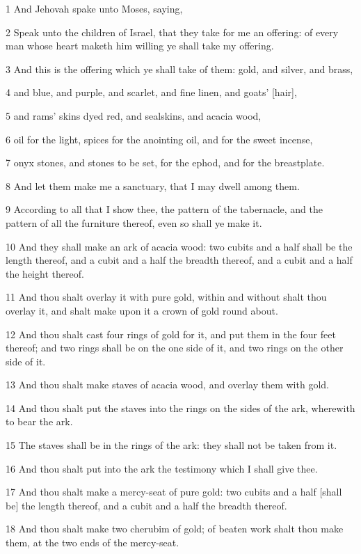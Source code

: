 \par 1 And Jehovah spake unto Moses, saying,
\par 2 Speak unto the children of Israel, that they take for me an offering: of every man whose heart maketh him willing ye shall take my offering.
\par 3 And this is the offering which ye shall take of them: gold, and silver, and brass,
\par 4 and blue, and purple, and scarlet, and fine linen, and goats' [hair],
\par 5 and rams' skins dyed red, and sealskins, and acacia wood,
\par 6 oil for the light, spices for the anointing oil, and for the sweet incense,
\par 7 onyx stones, and stones to be set, for the ephod, and for the breastplate.
\par 8 And let them make me a sanctuary, that I may dwell among them.
\par 9 According to all that I show thee, the pattern of the tabernacle, and the pattern of all the furniture thereof, even so shall ye make it.
\par 10 And they shall make an ark of acacia wood: two cubits and a half shall be the length thereof, and a cubit and a half the breadth thereof, and a cubit and a half the height thereof.
\par 11 And thou shalt overlay it with pure gold, within and without shalt thou overlay it, and shalt make upon it a crown of gold round about.
\par 12 And thou shalt cast four rings of gold for it, and put them in the four feet thereof; and two rings shall be on the one side of it, and two rings on the other side of it.
\par 13 And thou shalt make staves of acacia wood, and overlay them with gold.
\par 14 And thou shalt put the staves into the rings on the sides of the ark, wherewith to bear the ark.
\par 15 The staves shall be in the rings of the ark: they shall not be taken from it.
\par 16 And thou shalt put into the ark the testimony which I shall give thee.
\par 17 And thou shalt make a mercy-seat of pure gold: two cubits and a half [shall be] the length thereof, and a cubit and a half the breadth thereof.
\par 18 And thou shalt make two cherubim of gold; of beaten work shalt thou make them, at the two ends of the mercy-seat.
